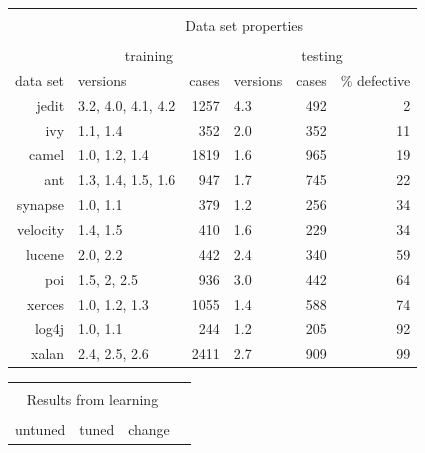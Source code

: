 \documentclass[conference]{IEEEtran}
\begin{document}
\begin{figure}[!t]
\scriptsize
   \begin{center}
   \begin{minipage}{.46\linewidth}
    \begin{tabular}{r@{~}|l@{~}|r@{~}|l@{~}|r@{~}|r@{~}|} \cline{2-6}
   & \multicolumn{5}{c|}{ }\\ 
   
   & \multicolumn{5}{c|}{ Data set  properties}\\ 
   & \multicolumn{5}{c|}{  }\\ 
           & \multicolumn{2}{c|}{training}   & \multicolumn{3}{c|}{testing}      \\ \cline{2-6}
   data set      & versions           & cases & versions     & cases    & \% defective             \\ \hline
        jedit    & 3.2, 4.0, 4.1, 4.2 & 1257      & 4.3          & 492          & 2 \\
        ivy      & 1.1, 1.4           & 352       & 2.0          & 352          & 11 \\
        camel    & 1.0, 1.2, 1.4      & 1819      & 1.6          & 965          & 19 \\
        ant      & 1.3, 1.4, 1.5, 1.6 & 947       & 1.7          & 745          & 22 \\
        synapse  & 1.0, 1.1           & 379       & 1.2          & 256          & 34 \\
        velocity & 1.4, 1.5           & 410       & 1.6          & 229          & 34 \\
        lucene   & 2.0, 2.2           & 442       & 2.4          & 340          & 59 \\
        poi      & 1.5, 2, 2.5        & 936       & 3.0          & 442          & 64 \\
        xerces   & 1.0, 1.2, 1.3      & 1055      & 1.4          & 588          & 74  \\ 
        log4j    & 1.0, 1.1           & 244       & 1.2          & 205          & 92   \\
        xalan    & 2.4, 2.5, 2.6      & 2411      & 2.7          & 909          & 99  \\\hline 
        
        
    \end{tabular}\end{minipage}\begin{minipage}{.4\linewidth}
    \begin{tabular}{|rrr|rrr|rr|l} \cline{1-8}
      \multicolumn{8}{|c|}{  }\\
      \multicolumn{8}{|c|}{  Results from learning}\\
       \multicolumn{8}{|c|}{   }\\
   \multicolumn{3}{|c|}{untuned} & \multicolumn{3}{c|}{tuned} & \multicolumn{2}{c|}{change}\\
  \cline{1-8}
  

\end{tabular}
\end{minipage}
\end{center}
\end{figure}
\end{document}

